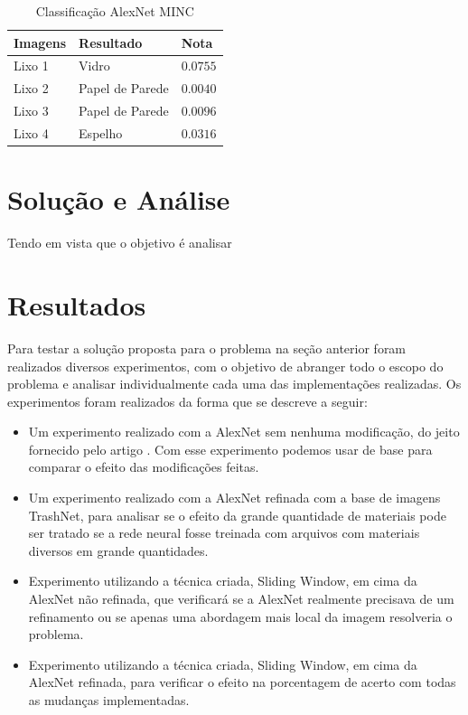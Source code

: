 \documentclass[conference, compsoc, 12pt]{IEEEtran}
\begin{document}
\begin{table}[]
\centering
\caption{Classificação AlexNet MINC}
\label{Tabela 1}
\begin{tabular}{|l|l|l|}
\hline
Imagens & Resultado & Nota \\ \hline
Lixo 1 & Vidro & $0.0755$ \\ \hline
Lixo 2 & Papel de Parede & $0.0040$ \\ \hline
Lixo 3 & Papel de Parede & $0.0096$\\ \hline
Lixo 4 & Espelho & $0.0316$ \\ \hline
\end{tabular}
\end{table}

\section{Solução e Análise}

Tendo em vista que o objetivo é analisar

\section{Resultados}

Para testar a solução proposta para o problema na seção anterior foram realizados diversos experimentos, com o objetivo de abranger todo o escopo do problema e analisar individualmente cada uma das implementações realizadas. Os experimentos foram realizados da forma que se descreve a seguir:

\begin{itemize}
    \item Um experimento realizado com a AlexNet sem nenhuma modificação, do jeito fornecido pelo artigo \cite{Artigo principal}. Com esse experimento podemos usar de base para comparar o efeito das modificações feitas.
    \item Um experimento realizado com a AlexNet refinada com a base de imagens TrashNet, para analisar se o efeito da grande quantidade de materiais pode ser tratado se a rede neural fosse treinada com arquivos com materiais diversos em grande quantidades.
    \item Experimento utilizando a técnica criada, Sliding Window, em cima da AlexNet não refinada, que verificará se a AlexNet realmente precisava de um refinamento ou se apenas uma abordagem mais local da imagem resolveria o problema.
    \item Experimento utilizando a técnica criada, Sliding Window, em cima da AlexNet refinada, para verificar o efeito na porcentagem de acerto com todas as mudanças implementadas.
\end{itemize}
\end{document}
